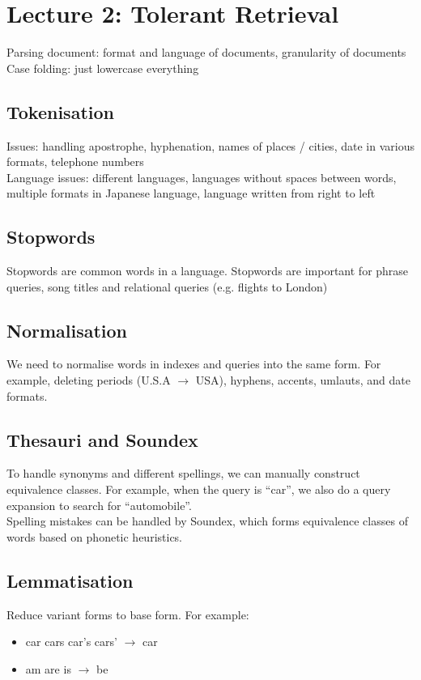 \chapter{Lecture 2: Tolerant Retrieval}
\begin{multicols*}{2}

\noindent Parsing document: format and language of documents, granularity of documents \\

\noindent Case folding: just lowercase everything

\section{Tokenisation}
\noindent Issues: handling apostrophe, hyphenation, names of places / cities, date in various formats, telephone numbers \\

\noindent Language issues: different languages, languages without spaces between words, multiple formats in Japanese language, language written from right to left

\section{Stopwords}
\noindent Stopwords are common words in a language. Stopwords are important for phrase queries, song titles and relational queries (e.g. flights to London)

\section{Normalisation}
\noindent We need to normalise words in indexes and queries into the same form. For example, deleting periods (U.S.A $\rightarrow$ USA), hyphens, accents, umlauts, and date formats.

\section{Thesauri and Soundex}
\noindent To handle synonyms and different spellings, we can manually construct equivalence classes. For example, when the query is ``car'', we also do a query expansion to search for ``automobile''. \\

\noindent Spelling mistakes can be handled by Soundex, which forms equivalence classes of words based on phonetic heuristics.

\section{Lemmatisation}
Reduce variant forms to base form. For example:
\begin{itemize}
    \item car cars car’s cars’ $\rightarrow$ car
    \item am are is $\rightarrow$ be
\end{itemize}


\end{multicols*}
